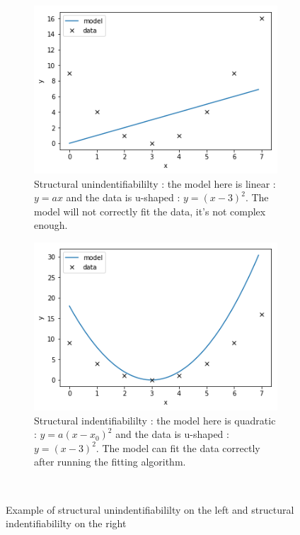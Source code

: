 \documentclass[11pt]{report}
\begin{document}
\begin{itemize}
\begin{figure}[H]
    \centering
    \captionsetup{singlelinecheck = false, format= hang, justification=centerlast, font=footnotesize, labelsep=space}
    \begin{subfigure}[b]{0.49\textwidth}
    \centering
        \includegraphics[width=\linewidth]{figures/structuralUnidentifiability.png}
        \caption{Structural unindentifiabililty : the model here is linear : $y=ax$ and the data is u-shaped : $y = (x-3)^2$. The model will not correctly fit the data, it's not complex enough.}
    \end{subfigure}
    \begin{subfigure}[b]{0.49\textwidth}
    \centering
        \includegraphics[width=\linewidth]{figures/structuralIdentifiability.png}
        \caption{Structural indentifiabililty : the model here is quadratic : $y=a(x-x_0)^2$ and the data is u-shaped : $y = (x-3)^2$. The model can fit the data correctly after running the fitting algorithm.}
    \end{subfigure}
    ~
    \caption{Example of structural unindentifiabililty on the left and structural indentifiabililty on the right}
    \label{fig:StructuralIdentifiabilityExample}
\end{figure}
    

\end{itemize}
\end{document}
